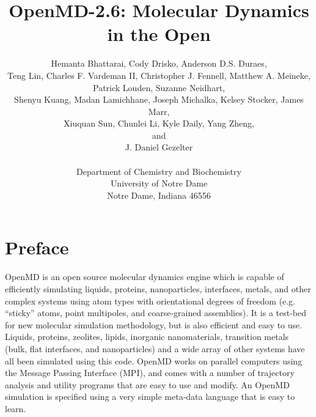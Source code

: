 \documentclass[]{book}
\begin{document}





\title{{\sc OpenMD-2.6}: Molecular Dynamics in the Open}

\author{Hemanta Bhattarai, Cody Drisko, Anderson D.S. Duraes,\\
  Teng Lin, Charles F. Vardeman II, Christopher J. Fennell, Matthew
  A. Meineke, \\
   Patrick Louden,  Suzanne Neidhart,\\
   Shenyu Kuang, Madan Lamichhane, Joseph Michalka, 
  Kelsey Stocker, James Marr, \\ Xiuquan Sun,
  Chunlei Li,  Kyle Daily, Yang Zheng, \\ and \\
  J. Daniel Gezelter \\ \\
  Department of Chemistry and Biochemistry\\
  University of Notre Dame\\
  Notre Dame, Indiana 46556}

\maketitle

\section*{Preface} 

{\sc OpenMD} is an open source molecular dynamics engine which is
capable of efficiently simulating liquids, proteins, nanoparticles,
interfaces, metals, and other complex systems using atom types with
orientational degrees of freedom (e.g. ``sticky'' atoms, point
multipoles, and coarse-grained assemblies). It is a test-bed for new
molecular simulation methodology, but is also efficient and easy to
use.  Liquids, proteins, zeolites, lipids, inorganic nanomaterials,
transition metals (bulk, flat interfaces, and nanoparticles) and a
wide array of other systems have all been simulated using this
code. {\sc OpenMD} works on parallel computers using the Message
Passing Interface (MPI), and comes with a number of trajectory
analysis and utility programs that are easy to use and modify. An
OpenMD simulation is specified using a very simple meta-data language
that is easy to learn.
\end{document}
